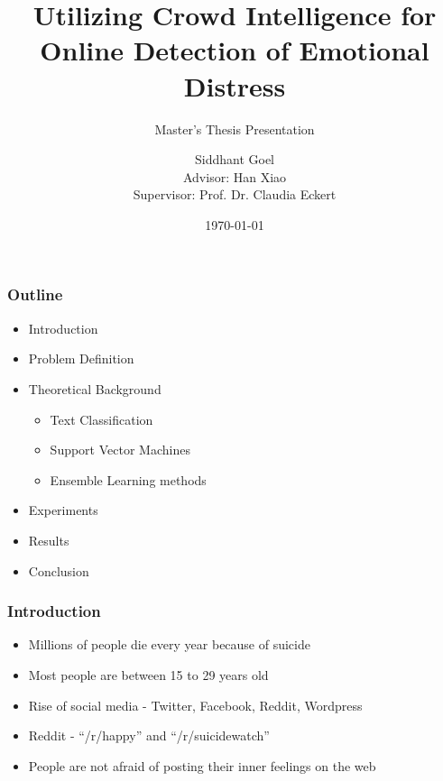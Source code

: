 \documentclass{beamer}
\title{Utilizing Crowd Intelligence for Online Detection of Emotional Distress}
\subtitle{Master's Thesis Presentation}
\author[Siddhant Goel]{Siddhant Goel\\{\small Advisor: Han Xiao\\Supervisor: Prof. Dr. Claudia Eckert}}
\institute{
Chair for IT Security\\
Technische Universit\"at M\"unchen
}
\date{\today}
\begin{document}
    \begin{frame}[plain]
        \titlepage
    \end{frame}
    
    \begin{frame}
        \frametitle{Outline}
        \begin{itemize}
            \item{Introduction}
            \item{Problem Definition}
            \item{
            Theoretical Background
            \begin{itemize}
                \item{Text Classification}
                \item{Support Vector Machines}
                \item{Ensemble Learning methods}
            \end{itemize}
            }
            \item{Experiments}
            \item{Results}
            \item{Conclusion}
        \end{itemize}
    \end{frame}
    
    \begin{frame}
        \frametitle{Introduction}
        \begin{itemize}
            \item{Millions of people die every year because of suicide}
            \item{Most people are between 15 to 29 years old}
            \item{Rise of social media - Twitter, Facebook, Reddit, Wordpress}
            \item{Reddit - ``/r/happy'' and ``/r/suicidewatch''}
            \item{People are not afraid of posting their inner feelings on the web}
        \end{itemize}
    \end{frame}
    
\end{document}
